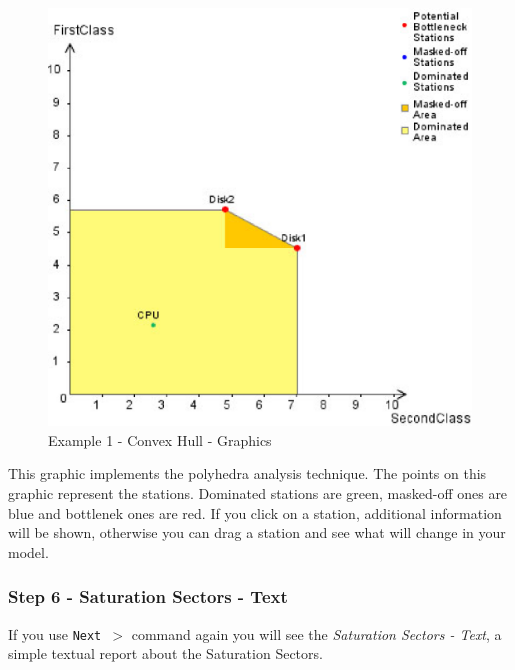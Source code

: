 \begin{figure}[htbp]
    \begin{center}
        \includegraphics[scale=.6]{img/jaba/example1ConvexHull}
    \end{center}
    \caption{Example 1 - Convex Hull - Graphics}
    \label{fig:jaba:example1ConvexHull}
\end{figure}

This graphic implements the polyhedra analysis technique. The points on this graphic represent the stations. Dominated stations are green, masked-off ones are blue and bottlenek ones are red. If you click on a station, additional information will be shown, otherwise you can drag a station and see what will change in your model.

\subsubsection{Step 6 - Saturation Sectors - Text}

If you use \texttt{Next $>$} command again you will see the \textit{Saturation Sectors - Text}, a simple textual report about the Saturation Sectors. 


